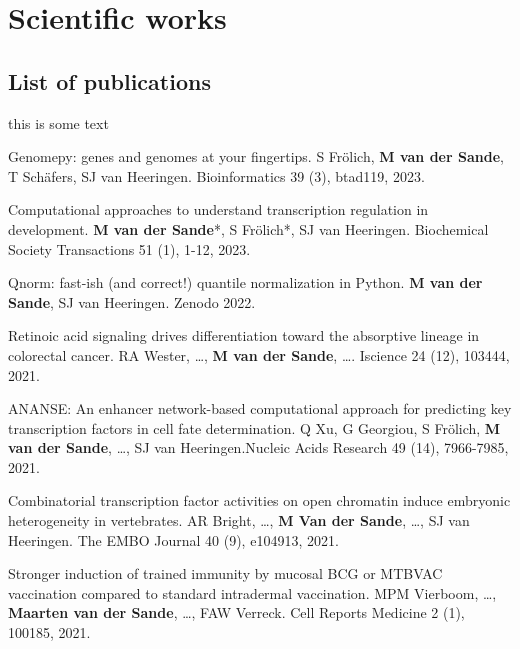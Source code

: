 \section{Scientific works}

\subsection{List of publications}

this is some text

\noindent
Genomepy: genes and genomes at your fingertips. S Frölich, \textbf{M van der Sande}, T Schäfers, SJ van Heeringen. Bioinformatics 39 (3), btad119, 2023. \cite{Frlich2023}
\newline

\noindent
Computational approaches to understand transcription regulation in development. \textbf{M van der Sande}*, S Frölich*, SJ van Heeringen. Biochemical Society Transactions 51 (1), 1-12, 2023. \cite{vanderSande2023}
\newline

\noindent
Qnorm: fast-ish (and correct!) quantile normalization in Python. \textbf{M van der Sande}, SJ van Heeringen. Zenodo 2022. \cite{vanderSande2021}
\newline

\noindent
Retinoic acid signaling drives differentiation toward the absorptive lineage in colorectal cancer. RA Wester, \ldots, \textbf{M van der Sande}, \ldots. Iscience 24 (12), 103444, 2021. \cite{Wester2021}
\newline

\noindent
ANANSE: An enhancer network-based computational approach for predicting key transcription factors in cell fate determination. Q Xu, G Georgiou, S Frölich, \textbf{M van der Sande}, \ldots, SJ van Heeringen.Nucleic Acids Research 49 (14), 7966-7985, 2021. \cite{Xu_2020}
\newline

\noindent
Combinatorial transcription factor activities on open chromatin induce embryonic heterogeneity in vertebrates. AR Bright, \ldots, \textbf{M Van der Sande}, \ldots, SJ van Heeringen. The EMBO Journal 40 (9), e104913, 2021. \cite{Bright_2021}
\newline

\noindent
Stronger induction of trained immunity by mucosal BCG or MTBVAC vaccination compared to standard intradermal vaccination. MPM Vierboom, \ldots, \textbf{Maarten van der Sande}, \ldots, FAW Verreck. Cell Reports Medicine 2 (1), 100185, 2021. \cite{Vierboom2021}
\newline

